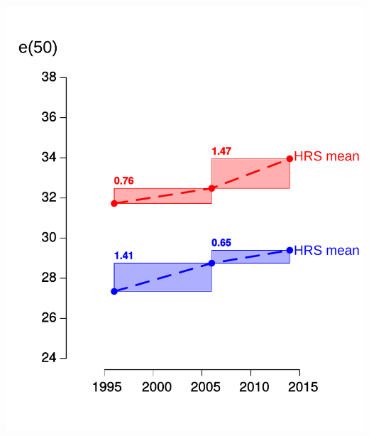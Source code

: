 \documentclass[20pt,usenames,dvipsnames]{beamer}
\begin{document}
\begin{frame}[plain]
\vspace{-1em}
\begin{center}
\includegraphics[height=20cm, keepaspectratio]{Figures/e50_4.pdf}
\end{center}
\end{frame}

%
\end{document}
